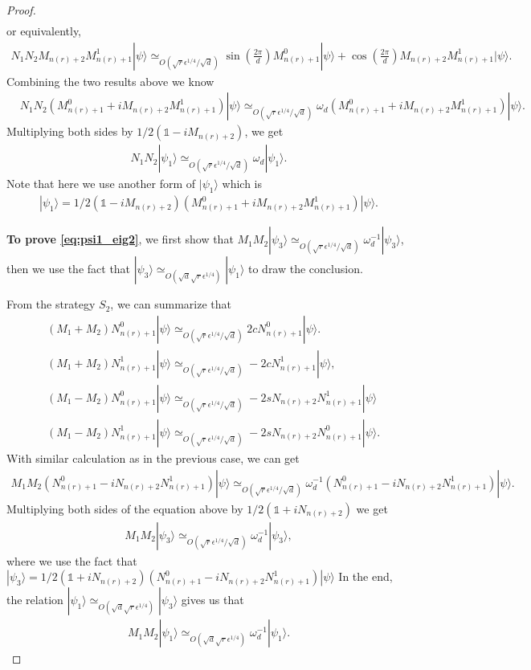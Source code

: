 \documentclass[11pt,letterpaper]{article}
\newcommand{\ket}[1]{|#1\rangle}
\newcommand{\1}{\mathbb{1}}
\newcommand{\nr}{n(r)}
\newcommand{\qe}{\epsilon^{1/4}}
\newcommand{\sd}{\sqrt{d}}
\newcommand{\sr}{\sqrt{r}}
\newcommand{\appd}[1]{\simeq_{#1}}
\theoremstyle{definition}
\begin{document}
\begin{proof}
\begin{align*}
        \end{align*}
        or equivalently,
        \begin{align*}
        		N_1N_2 M_{\nr+2}M_{\nr+1}^1 \ket{\psi}\appd{O(\sr \qe/\sd)} 
		\sin(\frac{2\pi}{d}) M_{\nr+1}^0\ket{\psi} + \cos(\frac{2\pi}{d})M_{\nr+2}M_{\nr+1}^1\ket{\psi}.
        \end{align*}
        Combining the two results above we know
	\begin{align}
		\label{eq:omegad}
		&N_1N_2 (M_{\nr+1}^0 + i M_{\nr+2}M_{\nr+1}^1) \ket{\psi} 
		\appd{O(\sr \qe/\sd)}\omega_d(M_{\nr+1}^0 + iM_{\nr+2}M_{\nr+1}^1) \ket{\psi}.
	\end{align}
	Multiplying both sides by $1/2(\1 - iM_{\nr+2})$, we get
	\begin{align}
		N_1N_2 \ket{\psi_1} \appd{O(\sr \qe/\sd)} \omega_d\ket{\psi_1}.
	\end{align}
	Note that here we use another form of $\ket{\psi_1}$ which is 
	\begin{align*}
	\ket{\psi_1} = 1/2(\1 - iM_{\nr+2})(M_{\nr+1}^0 + i M_{\nr+2}M_{\nr+1}^1) \ket{\psi}.
	\end{align*}
	
	\textbf{To prove \cref{eq:psi1_eig2}},
	we first show that $M_1M_2 \ket{\psi_3}\appd{O(\sr \qe/\sd)} \omega_d^{-1} \ket{\psi_3}$, then we 
	use the fact that $\ket{\psi_3} \appd{O(\sd \sr\qe)} \ket{\psi_1}$ to draw the conclusion.
	
	From the strategy $S_2$, we can summarize that 
	\begin{align}
		&(M_1+M_2) N_{\nr+1}^0 \ket{\psi} \appd{O(\sr \qe/\sd)} 2c N_{\nr+1}^0 \ket{\psi}.\\
		&(M_1+M_2) N_{\nr+1}^1 \ket{\psi}  \appd{O(\sr \qe/\sd)} -2cN_{\nr+1}^1 \ket{\psi},\\
		&(M_1-M_2) N_{\nr+1}^0\ket{\psi} \appd{O(\sr\qe/\sd)}-2sN_{\nr+2} N_{\nr+1}^1\ket{\psi}\\
		&(M_1 -M_2)N_{\nr+1}^1 \ket{\psi} \appd{O(\sr\qe/\sd)} -2sN_{\nr+2} N_{\nr+1}^0 \ket{\psi}.
	\end{align}
	With similar calculation as in the previous case, we can get 
	\begin{align*}
		M_1M_2 (N_{\nr+1}^0 - i N_{\nr+2}N_{\nr+1}^1) \ket{\psi} \appd{O(\sr \qe/\sd)} 
		\omega_d^{-1} (N_{\nr+1}^0 - i N_{\nr+2}N_{\nr+1}^1)\ket{\psi} .
	\end{align*}
	Multiplying both sides of the equation above by $1/2(\1+iN_{\nr+2})$ we get
	\begin{align}
		M_1M_2 \ket{\psi_3} \appd{O(\sr \qe/\sd)} \omega_d^{-1}\ket{\psi_3},
	\end{align}
	where we use the fact that $\ket{\psi_3} = 1/2(\1+iN_{\nr+2})(N_{\nr+1}^0 - i N_{\nr+2}N_{\nr+1}^1) \ket{\psi}$
	In the end, the relation $\ket{\psi_1}  \appd{O(\sd \sr\qe)} \ket{\psi_3}$ gives us that 
	\begin{align}
		M_1M_2 \ket{\psi_1} \appd{O(\sd \sr \qe)} \omega_d^{-1}\ket{\psi_1}.
	\end{align}
\end{proof}
\end{document}
